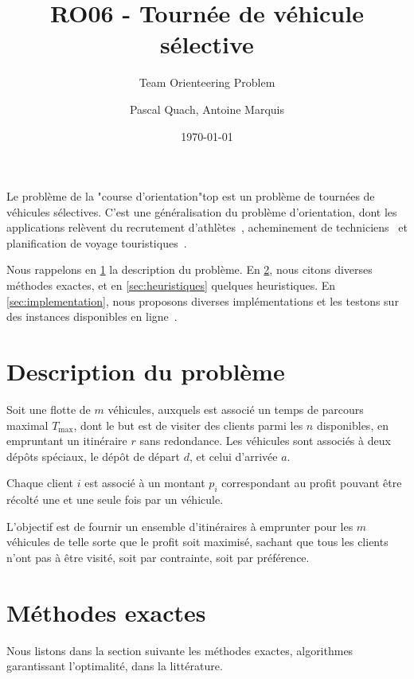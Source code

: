 \documentclass[a4paper]{scrartcl}
\title{RO06 - Tournée de véhicule sélective}
\subtitle{Team Orienteering Problem}
\author{Pascal Quach, Antoine Marquis}
\date{\today}
\begin{document}
\maketitle

Le problème de la "course d'orientation"\textemdash \gls{top} \textemdash est
un problème de tournées de véhicules sélectives. C'est une généralisation du
problème d'orientation, dont les applications relèvent du recrutement
d'athlètes~\parencite{chao.etal_feb1996}, acheminement de
techniciens~\parencite{bouly.etal_mar2008,tang.miller-hooks_jun2005} et
planification de voyage
touristiques~\parencite{vansteenwegen.etal_feb2011,vansteenwegen.etal_2009}.

Nous rappelons en \cref{sec:top-description} la description du problème. En
\cref{sec:méthodes-exactes}, nous citons diverses méthodes exactes, et en
\cref{sec:heuristiques} quelques heuristiques. En \cref{sec:implementation},
nous proposons diverses implémentations et les testons sur des instances
disponibles en ligne~\parencite{cib_test_instances,chao_1993,chao.etal_feb1996,tsiligirides_sep1984}.

\section{Description du problème}%
\label{sec:top-description}

Soit une flotte de $m$ véhicules, auxquels est associé un temps de parcours
maximal $T_{\max}$, dont le but est de visiter des clients parmi les $n$
disponibles, en empruntant un itinéraire $r$ sans redondance. Les véhicules
sont associés à deux dépôts spéciaux, le dépôt de départ $d$, et celui
d'arrivée $a$.

Chaque client $i$ est associé à un montant $p_i$ correspondant au profit
pouvant être récolté une et une seule fois par un véhicule.

L'objectif est de fournir un ensemble d'itinéraires à emprunter pour les $m$
véhicules de telle sorte que le profit soit maximisé, sachant que tous les
clients n'ont pas à être visité, soit par contrainte, soit par préférence.

\section{Méthodes exactes}%
\label{sec:méthodes-exactes}

Nous listons dans la section suivante les méthodes exactes, algorithmes
garantissant l'optimalité, dans la littérature. 
\end{document}

